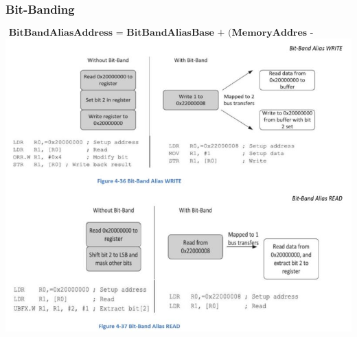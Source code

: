 \subsubsection{Bit-Banding}
\[\textbf{ BitBandAliasAddress = BitBandAliasBase + (MemoryAddres - BitbandRegionBase)* 32 + 4*BitNumber} \]
    \includegraphics[width=\textwidth]{images/bitbanding}